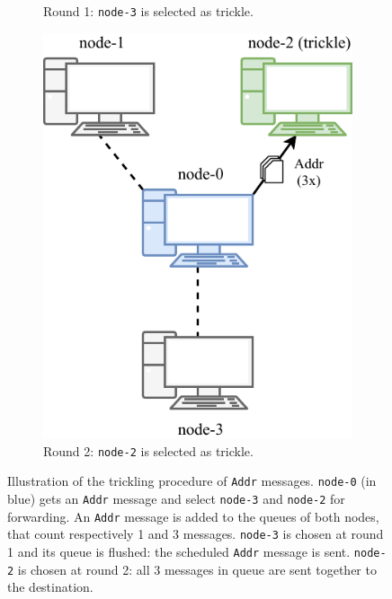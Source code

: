 \begin{figure}[ht]
\begin{subfigure}{.42\textwidth}
		\vspace*{0.1cm}
		\caption{
			Round \num{1}:
			\texttt{node-3} is selected as trickle.
		}
		\vspace*{0.2cm}
	\end{subfigure}
	\hfill
	\begin{subfigure}{.42\textwidth}
		\vspace*{0.5cm}
		\includegraphics[width=\columnwidth]{figures/trickling_2}
		\vspace*{0.1cm}
		\caption{
			Round \num{2}:
			\texttt{node-2} is selected as trickle.
		}
		\vspace*{0.2cm}
	\end{subfigure}
	\hspace*{0.2cm}
	\caption[Illustration of the trickling procedure]{
		Illustration of the trickling procedure of \texttt{Addr} messages.
		\texttt{node-0} (in blue) gets an \texttt{Addr} message and select \texttt{node-3} and \texttt{node-2} for forwarding.
		An \texttt{Addr} message is added to the queues of both nodes, that count respectively \num{1} and \num{3} messages.
		\texttt{node-3} is chosen at round \num{1} and its queue is flushed:
		the scheduled \texttt{Addr} message is sent.
		\texttt{node-2} is chosen at round \num{2}:
		all \num{3} messages in queue are sent together to the destination.
	}
	\label{fig:trickling}
\end{figure}

